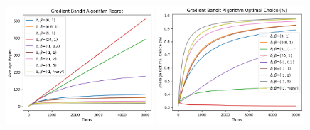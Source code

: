 \begin{figure}[!htbp]
    \centering
    \includegraphics[width=0.49\textwidth]{./figure/gradient_bandit_regret.png}
    \includegraphics[width=0.49\textwidth]{./figure/gradient_bandit_optimal.png}
\end{figure}
\newpage

